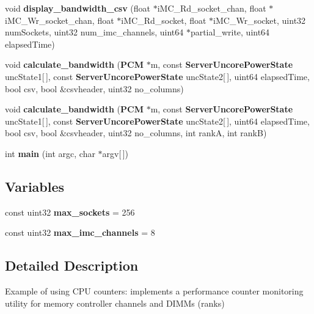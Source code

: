 \begin{DoxyCompactItemize}
\item 
void {\bfseries display\+\_\+bandwidth\+\_\+csv} (float $\ast$i\+M\+C\+\_\+\+Rd\+\_\+socket\+\_\+chan, float $\ast$i\+M\+C\+\_\+\+Wr\+\_\+socket\+\_\+chan, float $\ast$i\+M\+C\+\_\+\+Rd\+\_\+socket, float $\ast$i\+M\+C\+\_\+\+Wr\+\_\+socket, uint32 num\+Sockets, uint32 num\+\_\+imc\+\_\+channels, uint64 $\ast$partial\+\_\+write, uint64 elapsed\+Time)\label{pcm-memory_8cpp_a84a562a9664aede8e37b04407a7fe858}

\item 
void {\bfseries calculate\+\_\+bandwidth} ({\bf P\+CM} $\ast$m, const {\bf Server\+Uncore\+Power\+State} unc\+State1[$\,$], const {\bf Server\+Uncore\+Power\+State} unc\+State2[$\,$], uint64 elapsed\+Time, bool csv, bool \&csvheader, uint32 no\+\_\+columns)\label{pcm-memory_8cpp_aabd47f622ef28e0c311ce12b3984806d}

\item 
void {\bfseries calculate\+\_\+bandwidth} ({\bf P\+CM} $\ast$m, const {\bf Server\+Uncore\+Power\+State} unc\+State1[$\,$], const {\bf Server\+Uncore\+Power\+State} unc\+State2[$\,$], uint64 elapsed\+Time, bool csv, bool \&csvheader, uint32 no\+\_\+columns, int rankA, int rankB)\label{pcm-memory_8cpp_a7cc33b7bab828e05547e699288e8ced1}

\item 
int {\bfseries main} (int argc, char $\ast$argv[$\,$])\label{pcm-memory_8cpp_a0ddf1224851353fc92bfbff6f499fa97}

\end{DoxyCompactItemize}
\subsection*{Variables}
\begin{DoxyCompactItemize}
\item 
const uint32 {\bfseries max\+\_\+sockets} = 256\label{pcm-memory_8cpp_a7ef99323bd02eadd1f92faf654a892be}

\item 
const uint32 {\bfseries max\+\_\+imc\+\_\+channels} = 8\label{pcm-memory_8cpp_a2722bd2db68b8fa831786ce704a82bbb}

\end{DoxyCompactItemize}


\subsection{Detailed Description}
Example of using C\+PU counters\+: implements a performance counter monitoring utility for memory controller channels and D\+I\+M\+Ms (ranks) 

